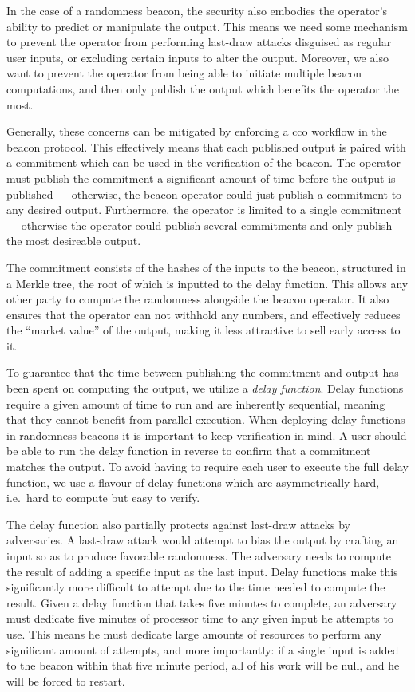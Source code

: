In the case of a randomness beacon, the security also embodies the operator's ability to predict or manipulate the output.
This means we need some mechanism to prevent the operator from performing last-draw attacks disguised as regular user inputs, or excluding certain inputs to alter the output.
Moreover, we also want to prevent the operator from being able to initiate multiple beacon computations, and then only publish the output which benefits the operator the most.

Generally, these concerns can be mitigated by enforcing a \gls{cco} workflow in the beacon protocol.
This effectively means that each published output is paired with a commitment which can be used in the verification of the beacon.
The operator must publish the commitment a significant amount of time before the output is published --- otherwise, the beacon operator could just publish a commitment to any desired output. Furthermore, the operator is limited to a single commitment --- otherwise the operator could publish several commitments and only publish the most desireable output.

The commitment consists of the hashes of the inputs to the beacon, structured in a Merkle tree, the root of which is inputted to the delay function. This allows any other party to compute the randomness alongside the beacon operator. It also ensures that the operator can not withhold any numbers, and effectively reduces the \enquote{market value} of the output, making it less attractive to sell early access to it.

To guarantee that the time between publishing the commitment and output has been spent on computing the output, we utilize a \emph{delay function}.
Delay functions require a given amount of time to run and are inherently sequential, meaning that they cannot benefit from parallel execution.
When deploying delay functions in randomness beacons it is important to keep verification in mind.
A user should be able to run the delay function in reverse to confirm that a commitment matches the output.
To avoid having to require each user to execute the full delay function, we use a flavour of delay functions which are asymmetrically hard, i.e.\ hard to compute but easy to verify.

The delay function also partially protects against last-draw attacks by adversaries. A last-draw attack would attempt to bias the output by crafting an input so as to produce favorable randomness. The adversary needs to compute the result of adding a specific input as the last input. Delay functions make this significantly more difficult to attempt due to the time needed to compute the result.
Given a delay function that takes five minutes to complete, an adversary must dedicate five minutes of processor time to any given input he attempts to use. This means he must dedicate large amounts of resources to perform any significant amount of attempts, and more importantly: if a single input is added to the beacon within that five minute period, all of his work will be null, and he will be forced to restart.


